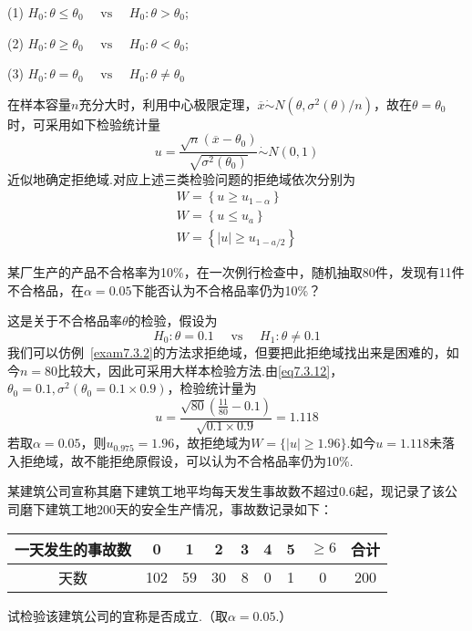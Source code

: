 (1) $H _ { 0 } : \theta \leq \theta _ { 0 } \quad \text { vs } \quad H _ { 0 } : \theta > \theta _ { 0 }$;

(2) $H _ { 0 } : \theta \geq \theta _ { 0 } \quad \text { vs } \quad H _ { 0 } : \theta < \theta _ { 0 }$;

(3)  $H _ { 0 } : \theta = \theta _ { 0 } \quad \text { vs } \quad H _ { 0 } : \theta \ne  \theta _ { 0 }$

在样本容量$n$充分大时，利用中心极限定理，$\overline { x }\dot{\sim}N \left( \theta , \sigma ^ { 2 } ( \theta ) / n \right)$，故在$\theta=\theta_{ 0 }$时，可采用如下检验统计量
\begin{equation}\label{eq7.3.12}
u=\frac{\sqrt{n}\left(\overline{x}-\theta_0\right)}{\sqrt{\sigma^2\left(\theta_0\right)}}\dot{\sim}N\left(0,1\right)
\end{equation}
近似地确定拒绝域.对应上述三类检验问题的拒绝域依次分别为
\[\begin{array} { l } { W = \left\{ u \geq u _ { 1 - \alpha } \right\} } \\ { W = \left\{ u \leq u _ { a } \right\} } \\ { W = \left\{ | u | \geq u _ { 1 - a / 2 } \right\} } \end{array}\]
\begin{example}\label{exam7.3.3}
	某厂生产的产品不合格率为10\%，在一次例行检查中，随机抽取80件，发现有11件不合格品，在$\alpha=0.05$下能否认为不合格品率仍为10\%？
\end{example}
\begin{solution}
	这是关于不合格品率$\theta$的检验，假设为
	\[H _ { 0 } : \theta = 0.1 \quad \text { vs } \quad H _ { 1 } : \theta \neq 0.1\]
	我们可以仿例~\ref{exam7.3.2}的方法求拒绝域，但要把此拒绝域找出来是困难的，如今$n=80$比较大，因此可采用大样本检验方法.由\ref{eq7.3.12}，$\theta_{0}=0.1,\sigma^{2}(\theta_{ 0 }=0.1\times 0.9)$，检验统计量为
	\[u = \frac { \sqrt { 80 } \left( \frac { 11 } { 80 } - 0.1 \right) } { \sqrt { 0.1 \times 0.9 } } = 1.118\]
	若取$\alpha = 0.05$，则$u _ { 0.975 } = 1.96$，故拒绝域为$W = \{ | u | \geq 1.96 \}$.如今$u = 1.118$未落入拒绝域，故不能拒绝原假设，可以认为不合格品率仍为10\%.
\end{solution}
\begin{example}\label{exam7.3.4}
	某建筑公司宣称其磨下建筑工地平均每天发生事故数不超过0.6起，现记录了该公司磨下建筑工地200天的安全生产情况，事故数记录如下：
	\begin{table}[!htp]
		\centering
		\begin{tabularx}{0.72\textwidth}{c|cccccccc}
一天发生的事故数&0&1&2&3&4&5&$\geq 6$&合计\\
		\midrule
天数&102&59&30&8&0&1&0&200
		\end{tabularx}
	\end{table}
试检验该建筑公司的宜称是否成立.（取$\alpha=0.05$.）
\end{example}
